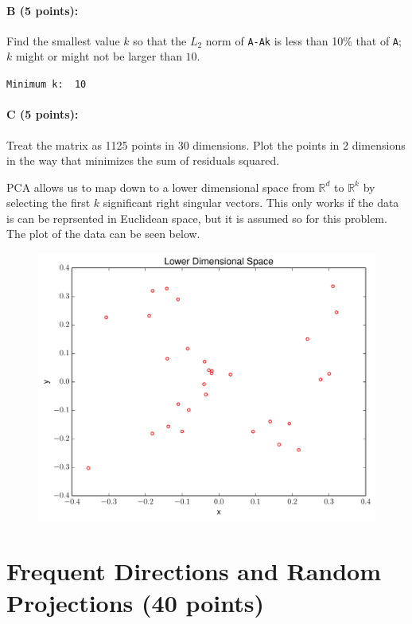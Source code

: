 \documentclass[11pt]{article}
\begin{document}
\paragraph{B (5 points):}
Find the smallest value $k$ so that the $L_2$ norm of \texttt{A-Ak} is less than 10\% that of \texttt{A}; $k$ might or might not be larger than $10$.  

\verb~Minimum k:  10~

\paragraph{C (5 points):}
Treat the matrix as 1125 points in 30 dimensions.  Plot the points in $2$ dimensions in the way that minimizes the sum of residuals squared.  

PCA allows us to map down to a lower dimensional space from $\mathbb{R}^{d}$ to $\mathbb{R}^{k}$ by selecting the first $k$ significant right singular vectors. This only works if the data is can be reprsented in Euclidean space, but it is assumed so for this problem. The plot of the data can be seen below.

\begin{figure}[H]
\centering
\includegraphics[width=.75\textwidth]{lower_dim.pdf}
\end{figure}



\section{Frequent Directions and Random Projections (40 points)}
\end{document}
